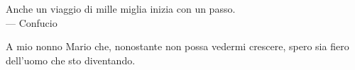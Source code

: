 
\cleardoublepage
{}
\thispagestyle{empty}

\vspace*{3cm}

\begin{center}
 Anche un viaggio di mille miglia inizia con un passo. \\ \medskip
--- Confucio    
\end{center}

\medskip

\begin{center}
A mio nonno Mario che, nonostante non possa vedermi crescere, spero sia fiero dell'uomo che sto diventando.
\end{center}
